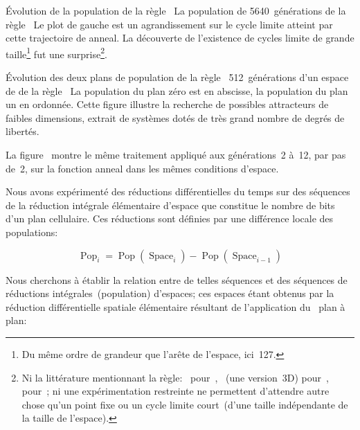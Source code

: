 %
{\'Evolution de la population de la r\`egle~}%
{La population de 5640~g\'en\'erations de la r\`egle~}%
{Le plot de gauche est un agrandissement sur le cycle limite atteint par
  cette trajectoire de anneal. %
  La d\'ecouverte de l'existence de cycles limite de grande
  taille\footnote{%
    Du m\^eme ordre de grandeur que l'ar\^ete de l'espace, ici~127. %
    } %
  fut une surprise\footnote{%
    Ni la litt\'erature mentionnant la r\`egle:~%
     pour~\cite{Vichniac86}, %
    ~(une version~3D) pour~\cite{Pickover92b}, %
     pour~\cite{Toffoli87}; %
    ni une exp\'erimentation restreinte ne permettent d'attendre autre
    chose qu'un point fixe ou un cycle limite court~(\ie d'une taille
    ind\'ependante de la taille de l'espace).}. %
  }

%
{\'Evolution des deux plans de population de la r\`egle~}
{512~g\'en\'erations d'un espace de  de la r\`egle~}
{La population du plan z\'ero est en abscisse, la population du plan un
  en ordonn\'ee. %
  Cette figure illustre la recherche de possibles attracteurs de
  faibles dimensions, extrait de syst\`emes dot\'es de tr\`es grand nombre de
  degr\'es de libert\'es. %
  }

\noindent%
La figure~ montre le m\^eme traitement
appliqu\'e aux g\'en\'erations~2 \`a~12, par pas de~2, sur la fonction anneal
dans les m\^emes conditions d'espace. %

Nous avons exp\'eriment\'e des r\'eductions diff\'erentielles du temps sur des
s\'equences de la r\'eduction int\'egrale \'el\'ementaire d'espace que constitue
le nombre de bits d'un plan cellulaire. %
Ces r\'eductions sont d\'efinies par une diff\'erence locale des
populations: %

\newcommand{\pop}{\operatorname{Pop}}
\newcommand{\spac}{\operatorname{Space}}

\[\pop_{i}=\pop(\spac_{i})-\pop(\spac_{i-1})\]

Nous cherchons \`a \'etablir la relation entre de telles s\'equences et des
s\'equences de r\'eductions int\'egrales~(population) d'espaces; %
ces espaces \'etant obtenus par la r\'eduction diff\'erentielle spatiale
\'el\'ementaire r\'esultant de l'application du \xor\ plan \`a plan:


